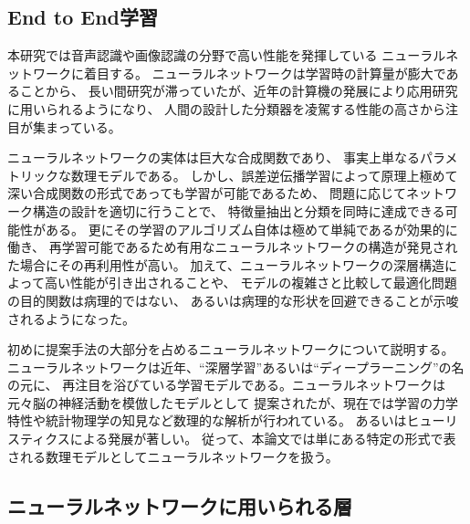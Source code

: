 \subsection{End to End学習}
本研究では音声認識や画像認識の分野で高い性能を発揮している
ニューラルネットワークに着目する。
ニューラルネットワークは学習時の計算量が膨大であることから、
長い間研究が滞っていたが、近年の計算機の発展により応用研究に用いられるようになり、
人間の設計した分類器を凌駕する性能の高さから注目が集まっている。

ニューラルネットワークの実体は巨大な合成関数であり、
事実上単なるパラメトリックな数理モデルである。
しかし、誤差逆伝播学習によって原理上極めて
深い合成関数の形式であっても学習が可能であるため、
問題に応じてネットワーク構造の設計を適切に行うことで、
特徴量抽出と分類を同時に達成できる可能性がある。
更にその学習のアルゴリズム自体は極めて単純であるが効果的に働き\cite{CheapLearning}、
再学習可能であるため有用なニューラルネットワークの構造が発見された場合にその再利用性が高い。
加えて、ニューラルネットワークの深層構造によって高い性能が引き出されること\cite{DeepvsShallow}や、
モデルの複雑さと比較して最適化問題の目的関数は病理的ではない、
あるいは病理的な形状を回避できることが示唆されるようになった\cite{ディープローカルミニマム}。


初めに提案手法の大部分を占めるニューラルネットワークについて説明する。
ニューラルネットワークは近年、``深層学習''あるいは``ディープラーニング''の名の元に、
再注目を浴びている学習モデルである。ニューラルネットワークは元々脳の神経活動を模倣したモデルとして
提案されたが、現在では学習の力学特性や統計物理学の知見など数理的な解析が行われている\cite{ディープローカルミニマム,DeepvsShallow}。
あるいはヒューリスティクスによる発展が著しい。
従って、本論文では単にある特定の形式で表される数理モデルとしてニューラルネットワークを扱う。


\subsection{\mc ニューラルネットワークに用いられる層}
